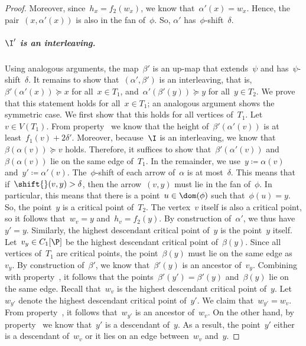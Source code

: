 \begin{proof}
Moreover, since~$h_x = f_2(w_x)$, we know that~$\alpha'(x) = w_x$.
Hence, the pair~$(x, \alpha'(x))$ is also in the fan of~$\phi$.
So, $\alpha'$ has~$\phi$-shift~$\delta$.
%
\subparagraph*{$\I'$ is an interleaving.}
Using analogous arguments, the map~$\beta'$ is an up-map that extends~$\psi$ and has~$\psi$-shift~$\delta$.
    It remains to show that~$(\alpha', \beta')$ is an interleaving, that is,~$\beta'(\alpha'(x)) \succeq x$ for all~$x \in T_1$, and~$\alpha'(\beta'(y)) \succeq y$ for all~$y \in T_2$.
    We prove that this statement holds for all~$x \in T_1$; an analogous argument shows the symmetric case.
    We first show that this holds for all vertices of~$T_1$.
    Let~$v \in V(T_1)$.
	From property~ we know that the height of~$\beta'(\alpha'(v))$ is at least~$f_1(v) + 2\delta'$.
	Moreover, because~$\I$ is an interleaving, we know that~$\beta(\alpha(v)) \succeq v$ holds.
	Therefore, it suffices to show that~$\beta'(\alpha'(v))$ and~$\beta(\alpha(v))$ lie on the same edge of~$T_1$.
	In the remainder, we use~$y \coloneqq \alpha(v)$ and~$y' \coloneqq \alpha'(v)$.
%
	The~$\phi$-shift of each arrow of~$\alpha$ is at most~$\delta$.
    This means that if~$\shift{}(v, y) > \delta$, then the arrow~$(v, y)$ must lie in the fan of~$\phi$.
	In particular, this means that there is a point~$u \in \dom(\phi)$ such that~$\phi(u) = y$.
    So, the point~$y$ is a critical point of~$T_2$.
	The vertex~$v$ itself is also a critical point, so it follows that~$w_v = y$ and~$h_v = f_2(y)$.
	By construction of~$\alpha'$, we thus have~$y' = y$.
	Similarly, the highest descendant critical point of~$y$ is the point~$y$ itself.
	Let~$v_y \in C_1[\P]$ be the highest descendant critical point of~$\beta(y)$.
    Since all vertices of~$T_1$ are critical points, the point~$\beta(y)$ must lie on the same edge as~$v_y$.
	By construction of~$\beta'$, we know that~$\beta'(y)$ is an ancestor of~$v_y$.
	Combining with property~, it follows that the points~$\beta'(y') = \beta'(y)$ and~$\beta(y)$ lie on the same edge.
%
	Recall that~$w_v$ is the highest descendant critical point of~$y$.
	Let~$w_{y'}$ denote the highest descendant critical point of~$y'$.
	We claim that~$w_{y'} = w_v$.
    From property~, it follows that~$w_{y'}$ is an ancestor of~$w_v$.
	On the other hand, by property~ we know that~$y'$ is a descendant of~$y$.
    As a result, the point~$y'$ either is a descendant of~$w_v$ or it lies on an edge between~$w_v$ and~$y$.

\end{proof}
